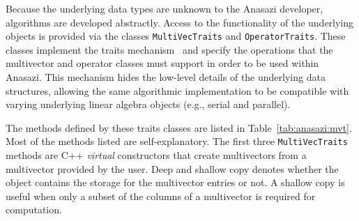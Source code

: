 \documentclass[acmtoms]{acmtrans2m}
\newcounter{algorithm}
\newcommand{\aspace}[1]{\texttt{#1}}
\begin{document}
Because the underlying data types are unknown to the Anasazi
developer, algorithms are developed abstractly. Access to the
functionality of the underlying objects is provided via the classes
\aspace{MultiVecTraits} and \aspace{OperatorTraits}. These classes
implement the traits mechanism~\cite{myer:95} and specify the
operations that the multivector and operator classes must support in
order to be used within Anasazi. This mechanism hides the low-level
details of the underlying data structures, allowing the same
algorithmic implementation to be compatible with varying underlying
linear algebra objects (e.g., serial and parallel).

The methods defined by these traits classes are listed in
Table~\ref{tab:anasazi:mvt}. Most of the methods listed are
self-explanatory. The first three \aspace{MultiVecTraits} methods
are C++ \emph{virtual} constructors \cite[pp.~123--129]{meyers:96}
that create multivectors from a multivector provided by the user. Deep and shallow
copy denotes whether the object contains the storage for the
multivector entries or not. A shallow copy is useful when only a subset
of the columns of a multivector is required for computation.
\end{document}
